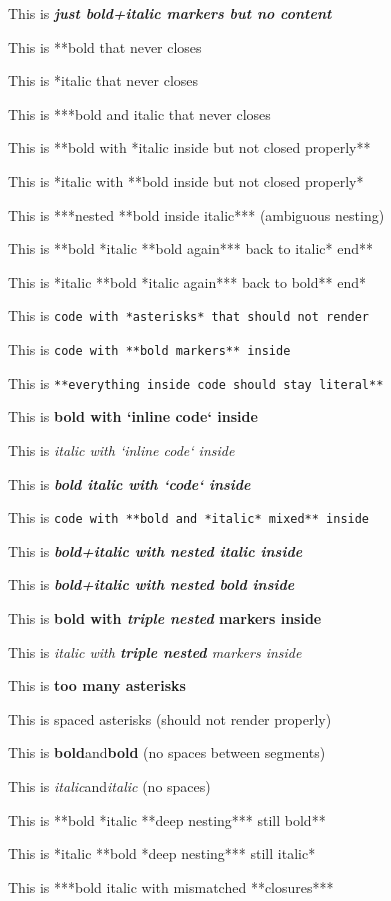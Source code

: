 \documentclass{article}
\begin{document}
This is \textbf{\emph{just bold+italic markers but no content}}

This is **bold that never closes

This is *italic that never closes

This is ***bold and italic that never closes

This is **bold with *italic inside but not closed properly**

This is *italic with **bold inside but not closed properly*

This is ***nested **bold inside italic*** (ambiguous nesting)

This is **bold *italic **bold again*** back to italic* end**

This is *italic **bold *italic again*** back to bold** end*

This is \texttt{code with *asterisks* that should not render}

This is \texttt{code with **bold markers** inside}

This is \texttt{**everything inside code should stay literal**}

This is \textbf{bold with `inline code` inside}

This is \emph{italic with `inline code` inside}

This is \textbf{\emph{bold italic with `code` inside}}

This is \texttt{code with **bold and *italic* mixed** inside}

This is \textbf{\emph{bold+italic with \emph{nested italic} inside}}

This is \textbf{\emph{bold+italic with \textbf{nested bold} inside}}

This is \textbf{bold with \textbf{\emph{triple nested}} markers inside}

This is \emph{italic with \textbf{\emph{triple nested}} markers inside}

This is \textbf{\emph{}}\textbf{too many asterisks\textbf{\emph{}}}

This is \emph{ } spaced asterisks \emph{ } (should not render properly)

This is \textbf{bold}and\textbf{bold} (no spaces between segments)

This is \emph{italic}and\emph{italic} (no spaces)

This is **bold *italic **deep nesting*** still bold**

This is *italic **bold *deep nesting*** still italic*

This is ***bold italic with mismatched **closures***
\end{document}
